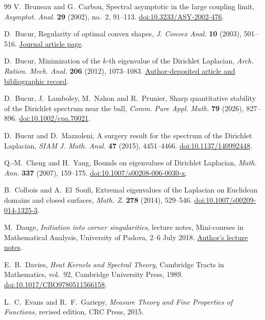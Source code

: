 \documentclass[11pt,reqno]{amsart}
\numberwithin{equation}{section}
\begin{document}
\begin{thebibliography}{99}
V.~Bruneau and G.~Carbou,
Spectral asymptotic in the large coupling limit,
\emph{Asymptot. Anal.} \textbf{29} (2002), no.~2, 91--113.
\href{https://doi.org/10.3233/ASY-2002-476}{doi:10.3233/ASY-2002-476}.

D.~Bucur,
Regularity of optimal convex shapes,
\emph{J. Convex Anal.} \textbf{10} (2003), 501--516.
\href{https://journalofconvexanalysis.com/articles/jca1031/}{Journal article page}.

D.~Bucur,
Minimization of the $k$-th eigenvalue of the Dirichlet Laplacian,
\emph{Arch. Ration. Mech. Anal.} \textbf{206} (2012), 1073--1083.
\href{https://cvgmt.sns.it/paper/1792/}{Author-deposited article and bibliographic record}.

D.~Bucur, J.~Lamboley, M.~Nahon and R.~Prunier,
Sharp quantitative stability of the Dirichlet spectrum near the ball,
\emph{Comm. Pure Appl. Math.} \textbf{79} (2026), 827--896.
\href{https://doi.org/10.1002/cpa.70021}{doi:10.1002/cpa.70021}.

D.~Bucur and D.~Mazzoleni,
A surgery result for the spectrum of the Dirichlet Laplacian,
\emph{SIAM J. Math. Anal.} \textbf{47} (2015), 4451--4466.
\href{https://doi.org/10.1137/140992448}{doi:10.1137/140992448}.

Q.-M.~Cheng and H.~Yang,
Bounds on eigenvalues of Dirichlet Laplacian,
\emph{Math. Ann.} \textbf{337} (2007), 159--175.
\href{https://doi.org/10.1007/s00208-006-0030-x}{doi:10.1007/s00208-006-0030-x}.

B.~Colbois and A.~El~Soufi,
Extremal eigenvalues of the Laplacian on Euclidean domains and closed surfaces,
\emph{Math. Z.} \textbf{278} (2014), 529--546.
\href{https://doi.org/10.1007/s00209-014-1325-3}{doi:10.1007/s00209-014-1325-3}.

M.~Dauge,
\emph{Initiation into corner singularities},
lecture notes, Mini-courses in Mathematical Analysis,
University of Padova, 2--6 July 2018.
\href{https://events.math.unipd.it/minicorsi/sites/default/files/2017/DaugeCorso.pdf}
{Author's lecture notes}.

E.~B.~Davies,
\emph{Heat Kernels and Spectral Theory},
Cambridge Tracts in Mathematics, vol.~92,
Cambridge University Press, 1989.
\href{https://doi.org/10.1017/CBO9780511566158}{doi:10.1017/CBO9780511566158}.

L.~C.~Evans and R.~F.~Gariepy,
\emph{Measure Theory and Fine Properties of Functions},
revised edition, CRC Press, 2015.


\end{thebibliography}
\end{document}
